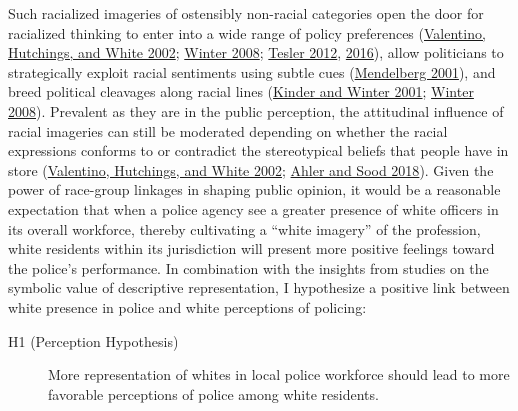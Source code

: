 \documentclass[
  12pt,
]{article}
\begin{document}
Such racialized imageries of ostensibly non-racial categories open the
door for racialized thinking to enter into a wide range of policy
preferences (\protect\hyperlink{ref-valentino2002}{Valentino, Hutchings,
and White 2002}; \protect\hyperlink{ref-winter2008}{Winter 2008};
\protect\hyperlink{ref-tesler2012}{Tesler 2012},
\protect\hyperlink{ref-tesler2016}{2016}), allow politicians to
strategically exploit racial sentiments using subtle cues
(\protect\hyperlink{ref-mendelberg2001}{Mendelberg 2001}), and breed
political cleavages along racial lines
(\protect\hyperlink{ref-kinder2001}{Kinder and Winter 2001};
\protect\hyperlink{ref-winter2008}{Winter 2008}). Prevalent as they are
in the public perception, the attitudinal influence of racial imageries
can still be moderated depending on whether the racial expressions
conforms to or contradict the stereotypical beliefs that people have in
store (\protect\hyperlink{ref-valentino2002}{Valentino, Hutchings, and
White 2002}; \protect\hyperlink{ref-ahler2018}{Ahler and Sood 2018}).
Given the power of race-group linkages in shaping public opinion, it
would be a reasonable expectation that when a police agency see a
greater presence of white officers in its overall workforce, thereby
cultivating a ``white imagery'' of the profession, white residents
within its jurisdiction will present more positive feelings toward the
police's performance. In combination with the insights from studies on
the symbolic value of descriptive representation, I hypothesize a
positive link between white presence in police and white perceptions of
policing:

\begin{description}
\item[H1 (Perception Hypothesis)]
More representation of whites in local police workforce should lead to
more favorable perceptions of police among white residents.
\end{description}
\end{document}
